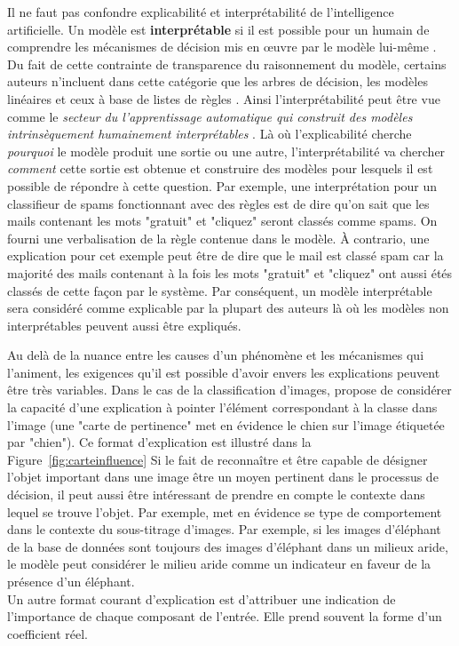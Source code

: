 \documentclass{report}
\begin{document}
        Il ne faut pas confondre explicabilité et interprétabilité de l'intelligence artificielle. Un modèle est \textbf{interprétable} si il est possible pour un humain de comprendre les mécanismes de décision mis en \oe uvre par le modèle lui-même \cite{garouani_investigating_2024, gilpin_explaining_2019}. Du fait de cette contrainte de transparence du raisonnement du modèle, certains auteurs n'incluent dans cette catégorie que les arbres de décision, les modèles linéaires et ceux à base de listes de règles \cite{bell_its_2022}. Ainsi l'interprétabilité peut être vue comme le \emph{secteur du l'apprentissage automatique qui construit des modèles intrinsèquement humainement interprétables} \cite{rudin_stop_2019}. Là où l'explicabilité cherche \emph{pourquoi} le modèle produit une sortie ou une autre, l'interprétabilité va chercher \emph{comment} cette sortie est obtenue et construire des modèles pour lesquels il est possible de répondre à cette question. Par exemple, une interprétation pour un classifieur de spams fonctionnant avec des règles est de dire qu'on sait que les mails contenant les mots "gratuit" et "cliquez" seront classés comme spams. On fourni une verbalisation de la règle contenue dans le modèle. À contrario, une explication pour cet exemple peut être de dire que le mail est classé spam car la majorité des mails contenant à la fois les mots "gratuit" et "cliquez" ont aussi étés classés de cette façon par le système. Par conséquent, un modèle interprétable sera considéré comme explicable par la plupart des auteurs là où les modèles non interprétables peuvent aussi être expliqués.
        
        Au delà de la nuance entre les causes d'un phénomène et les mécanismes qui l'animent, les exigences qu'il est possible d'avoir envers les explications peuvent être très variables. Dans le cas de la classification d'images, \cite{chefer_transformer_2021} propose de considérer la capacité d'une explication à pointer l'élément correspondant à la classe dans l'image (une "carte de pertinence" met en évidence le chien sur l'image étiquetée par "chien"). Ce format d'explication est illustré dans la Figure~\ref{fig:carteinfluence} Si le fait de reconnaître et être capable de désigner l'objet important dans une image être un moyen pertinent dans le processus de décision, il peut aussi être intéressant de prendre en compte le contexte dans lequel se trouve l'objet. Par exemple, \cite{elguendouze_explainable_2024} met en évidence se type de comportement dans le contexte du sous-titrage d'images. Par exemple, si les images d'éléphant de la base de données sont toujours des images d'éléphant dans un milieux aride, le modèle peut considérer le milieu aride comme un indicateur en faveur de la présence d'un éléphant. \\
        Un autre format courant d'explication est d'attribuer une indication de l'importance de chaque composant de l'entrée. Elle prend souvent la forme d'un coefficient réel. 
        
\end{document}
